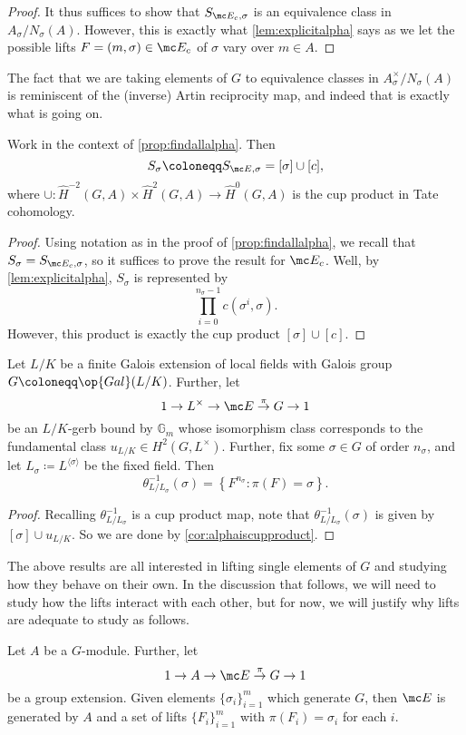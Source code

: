 \begin{proof}
	It thus suffices to show that $S_{\mc E_c,\sigma}$ is an equivalence class in $A_\sigma/N_\sigma(A)$. However, this is exactly what \autoref{lem:explicitalpha} says as we let the possible lifts $F=(m,\sigma)\in\mc E_c$ of $\sigma$ vary over $m\in A$.
\end{proof}
The fact that we are taking elements of $ G$ to equivalence classes in $A_\sigma^\times/N_\sigma\left(A\right)$ is reminiscent of the (inverse) Artin reciprocity map, and indeed that is exactly what is going on.
\begin{cor} \label{cor:alphaiscupproduct}
	Work in the context of \autoref{prop:findallalpha}. Then
	\[S_\sigma\coloneqq S_{\mc E,\sigma}=[\sigma]\cup[c],\]
	where $\cup\colon\widehat H^{-2}( G,A)\times\widehat H^2( G,A)\to\widehat H^0( G,A)$ is the cup product in Tate cohomology.
\end{cor}
\begin{proof}
	Using notation as in the proof of \autoref{prop:findallalpha}, we recall that $S_\sigma=S_{\mc E_c,\sigma}$, so it suffices to prove the result for $\mc E_c$. Well, by \autoref{lem:explicitalpha}, $S_\sigma$ is represented by
	\[\prod_{i=0}^{n_\sigma-1}c\left(\sigma^i,\sigma\right).\]
	However, this product is exactly the cup product $[\sigma]\cup[c]$.
\end{proof}
\begin{cor}
	Let $L/K$ be a finite Galois extension of local fields with Galois group $ G\coloneqq\op{Gal}(L/K)$. Further, let
	\[1\to L^\times\to\mc E\stackrel\pi\to G\to1\]
	be an $L/K$-gerb bound by $\mathbb G_m$ whose isomorphism class corresponds to the fundamental class $u_{L/K}\in H^2( G,L^\times)$. Further, fix some $\sigma\in G$ of order $n_\sigma$, and let $L_\sigma\coloneqq L^{\langle\sigma\rangle}$ be the fixed field. Then
	\[\theta_{L/L_\sigma}^{-1}(\sigma)=\left\{F^{n_\sigma}:\pi(F)=\sigma\right\}.\]
\end{cor}
\begin{proof}
	Recalling $\theta_{L/L_\sigma}^{-1}$ is a cup product map, note that $\theta_{L/L_\sigma}^{-1}(\sigma)$ is given by $[\sigma]\cup u_{L/K}$. So we are done by \autoref{cor:alphaiscupproduct}.
\end{proof}
The above results are all interested in lifting single elements of $ G$ and studying how they behave on their own. In the discussion that follows, we will need to study how the lifts interact with each other, but for now, we will justify why lifts are adequate to study as follows.
\begin{proposition} \label{prop:liftsgenerate}
	Let $A$ be a $ G$-module. Further, let
	\[1\to A\to\mc E\stackrel\pi\to G\to1\]
	be a group extension. Given elements $\{\sigma_i\}_{i=1}^m$ which generate $ G$, then $\mc E$ is generated by $A$ and a set of lifts $\{F_i\}_{i=1}^m$ with $\pi(F_i)=\sigma_i$ for each $i$.
\end{proposition}
